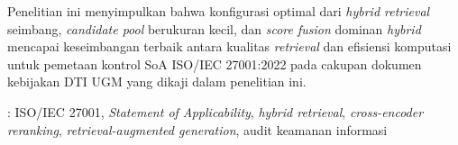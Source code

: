 Penelitian ini menyimpulkan bahwa konfigurasi optimal dari \textit{hybrid retrieval} seimbang, \textit{candidate pool} berukuran kecil, dan \textit{score fusion} dominan \textit{hybrid} mencapai keseimbangan terbaik antara kualitas \textit{retrieval} dan efisiensi komputasi untuk pemetaan kontrol SoA ISO/IEC 27001:2022 pada cakupan dokumen kebijakan DTI UGM yang dikaji dalam penelitian ini.

 : ISO/IEC 27001, \textit{Statement of Applicability}, \textit{hybrid retrieval}, \textit{cross-encoder reranking}, \textit{retrieval-augmented generation}, audit keamanan informasi

